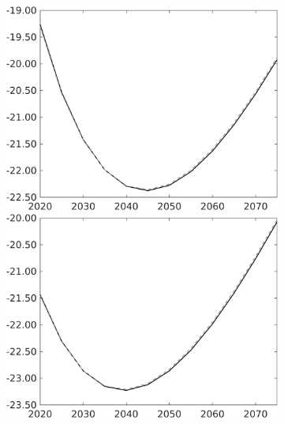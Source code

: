 \begin{figure}[h!!]
\begin{subfigure}{0.75\textwidth}
\begin{minipage}[]{0.32\textwidth}
	\end{minipage}
\begin{minipage}[]{0.32\textwidth}
\includegraphics[width=1\textwidth]{../../codding_model/own_basedOnFried/optimalPol_010922_revision/figures/all_13Sept22/PerdifNoTauf_Equlab_regime0_CompTaul_snS_spillover0_nsk0_xgr0_knspil1_sep0_LFlimit0_emsbase0_countec0_GovRev0_etaa0.79_lgd0.png}
\end{minipage}
\begin{minipage}[]{0.32\textwidth}
\includegraphics[width=1\textwidth]{../../codding_model/own_basedOnFried/optimalPol_010922_revision/figures/all_13Sept22/PerdifNoTauf_Equlab_regime0_CompTaul_sn_spillover0_nsk0_xgr0_knspil1_sep0_LFlimit0_emsbase0_countec0_GovRev0_etaa0.79_lgd0.png}
\end{minipage}
\end{subfigure}		
\end{figure} 
\clearpage

